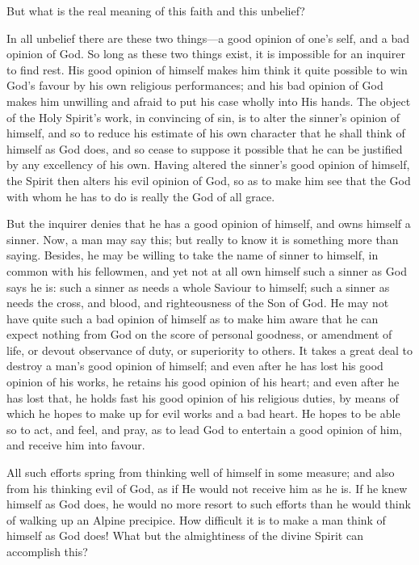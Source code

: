 \documentclass[
]{book}
\begin{document}
But what is the real meaning of this faith and this unbelief?

In all unbelief there are these two things---a good opinion of one's self, and a bad opinion of God. So long as these two things exist, it is impossible for an inquirer to find rest. His good opinion of himself makes him think it quite possible to win God's favour by his own religious performances; and his bad opinion of God makes him unwilling and afraid to put his case wholly into His hands. The object of the Holy Spirit's work, in convincing of sin, is to alter the sinner's opinion of himself, and so to reduce his estimate of his own character that he shall think of himself as God does, and so cease to suppose it possible that he can be justified by any excellency of his own. Having altered the sinner's good opinion of himself, the Spirit then alters his evil opinion of God, so as to make him see that the God with whom he has to do is really the God of all grace.

But the inquirer denies that he has a good opinion of himself, and owns himself a sinner. Now, a man may say this; but really to know it is something more than saying. Besides, he may be willing to take the name of sinner to himself, in common with his fellowmen, and yet not at all own himself such a sinner as God says he is: such a sinner as needs a whole Saviour to himself; such a sinner as needs the cross, and blood, and righteousness of the Son of God. He may not have quite such a bad opinion of himself as to make him aware that he can expect nothing from God on the score of personal goodness, or amendment of life, or devout observance of duty, or superiority to others. It takes a great deal to destroy a man's good opinion of himself; and even after he has lost his good opinion of his works, he retains his good opinion of his heart; and even after he has lost that, he holds fast his good opinion of his religious duties, by means of which he hopes to make up for evil works and a bad heart. He hopes to be able so to act, and feel, and pray, as to lead God to entertain a good opinion of him, and receive him into favour.

All such efforts spring from thinking well of himself in some measure; and also from his thinking evil of God, as if He would not receive him as he is. If he knew himself as God does, he would no more resort to such efforts than he would think of walking up an Alpine precipice. How difficult it is to make a man think of himself as God does! What but the almightiness of the divine Spirit can accomplish this?
\end{document}
